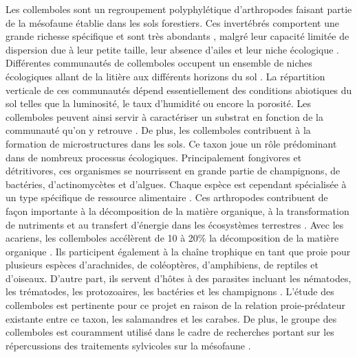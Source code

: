 Les collemboles sont un regroupement polyphylétique d'arthropodes faisant partie de la mésofaune établie dans les sols forestiers.
Ces invertébrés comportent une grande richesse spécifique et sont très abondants \citep{rusekBiodiversityCollembolaTheir1998}, 
malgré leur capacité limitée de dispersion due à leur petite taille, leur absence d’ailes et leur niche écologique \citep{Ojala2001Dispersalmicroarthropods}.
Différentes communautés de collemboles occupent un ensemble de niches écologiques allant de la litière aux différents horizons du sol \citep{pongeVerticalDistributionCollembola2000}.
La répartition verticale de ces communautés dépend essentiellement des conditions abiotiques du sol telles que la luminosité, le taux d’humidité ou encore la porosité.
Les collemboles peuvent ainsi servir à caractériser un substrat en fonction de la communauté qu’on y retrouve \citep{rusekBiodiversityCollembolaTheir1998}.
De plus, les collemboles contribuent à la formation de microstructures dans les sols. 
Ce taxon joue un rôle prédominant dans de nombreux processus écologiques. 
Principalement fongivores et détritivores, ces organismes se nourrissent en grande partie de champignons, de bactéries, d'actinomycètes et d'algues. 
Chaque espèce est cependant spécialisée à un type spécifique de ressource alimentaire \citep{Chen1995Foodpreference,rusekBiodiversityCollembolaTheir1998}.
Ces arthropodes contribuent de façon importante à la décomposition de la matière organique, à la transformation de nutriments et 
au transfert d’énergie dans les écosystèmes terrestres \citep{rusekBiodiversityCollembolaTheir1998,Hattenschwiler2005Biodiversitylitter,Cuchta2019importantrole,Marsden2020Howagroforestry}.
Avec les acariens, les collemboles accélèrent de 10 à 20\% la décomposition de la matière organique \citep{Hattenschwiler2005Biodiversitylitter}.
Ils participent également à la chaîne trophique en tant que proie pour plusieurs espèces d’arachnides, de coléoptères, d’amphibiens, de reptiles et d’oiseaux. 
D’autre part, ils servent d’hôtes à des parasites incluant les nématodes, les trématodes, les protozoaires, les bactéries et les champignons \citep{rusekBiodiversityCollembolaTheir1998}.
L'étude des collemboles est pertinente pour ce projet en raison de la relation proie-prédateur existante entre ce taxon, les salamandres et les carabes. 
De plus, le groupe des collemboles est couramment utilisé dans le cadre de recherches portant sur les répercussions des traitements sylvicoles sur la mésofaune \citep{Salmon2008Relationshipssoil,farskaManagementIntensityAffects2014,rousseauWoodyBiomassRemoval2019}.



